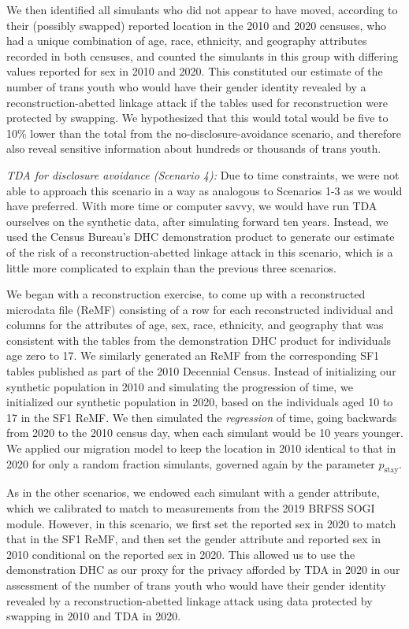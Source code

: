 \documentclass{jpc} %
\theoremstyle{plain}\newtheorem{satz}[thm]{Satz} %
\begin{document}
We then identified all simulants who did not appear to have moved, according to their (possibly swapped) reported location in the 2010 and 2020 censuses, who had a unique combination of age, race, ethnicity, and geography attributes recorded in both censuses, and counted the simulants in this group with differing values reported for sex in 2010 and 2020.  This constituted our estimate of the number of trans youth who would have their gender identity revealed by a reconstruction-abetted linkage attack if the tables used for reconstruction were protected by swapping.  We hypothesized that this would total would be five to 10\% lower than the total from the no-disclosure-avoidance scenario, and therefore also reveal sensitive information about hundreds or thousands of trans youth.

\emph{TDA for disclosure avoidance (Scenario 4):} Due to time constraints, we were not able to approach this scenario in a way as analogous to Scenarios 1-3 as we would have preferred.  With more time or computer savvy, we would have run TDA ourselves on the synthetic data, after simulating forward ten years.  Instead, we used the Census Bureau's DHC demonstration product to generate our estimate of the risk of a reconstruction-abetted linkage attack in this scenario, which is a little more complicated to explain than the previous three scenarios.

We began with a reconstruction exercise, to come up with a reconstructed microdata file (ReMF) consisting of a row for each reconstructed individual and columns for the attributes of age, sex, race, ethnicity, and geography that was consistent with the tables from the demonstration DHC product for individuals age zero to 17.  We similarly generated an ReMF from the corresponding SF1 tables published as part of the 2010 Decennial Census.  Instead of initializing our synthetic population in 2010 and simulating the progression of time, we initialized our synthetic population in 2020, based on the individuals aged 10 to 17 in the SF1 ReMF.  We then simulated the \emph{regression} of time, going backwards from 2020 to the 2010 census day, when each simulant would be 10 years younger.  We applied our migration model to keep the location in 2010 identical to that in 2020 for only a random fraction simulants, governed again by the parameter $p_{\text{stay}}$.

As in the other scenarios, we endowed each simulant with a gender attribute, which we calibrated to match to measurements from the 2019 BRFSS SOGI module. However, in this scenario, we first set the reported sex in 2020 to match that in the SF1 ReMF, and then set the gender attribute and reported sex in 2010 conditional on the reported sex in 2020.  This allowed us to use the demonstration DHC as our proxy for the privacy afforded by TDA in 2020 in our assessment of the number of trans youth who would have their gender identity revealed by a reconstruction-abetted linkage attack using data protected by swapping in 2010 and TDA in 2020.
\end{document}
